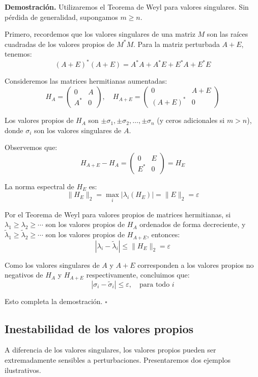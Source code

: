 \documentclass[12pt]{article}
\begin{document}
\textbf{Demostración.} Utilizaremos el Teorema de Weyl para valores singulares. Sin pérdida de generalidad, supongamos $m \geq n$.

Primero, recordemos que los valores singulares de una matriz $M$ son las raíces cuadradas de los valores propios de $M^*M$. Para la matriz perturbada $A + E$, tenemos:
\[
(A + E)^*(A + E) = A^*A + A^*E + E^*A + E^*E
\]

Consideremos las matrices hermitianas aumentadas:
\[
H_A = \begin{pmatrix}
0 & A \\
A^* & 0
\end{pmatrix}, \quad
H_{A+E} = \begin{pmatrix}
0 & A + E \\
(A + E)^* & 0
\end{pmatrix}
\]

Los valores propios de $H_A$ son $\pm\sigma_1, \pm\sigma_2, \ldots, \pm\sigma_n$ (y ceros adicionales si $m > n$), donde $\sigma_i$ son los valores singulares de $A$.

Observemos que:
\[
H_{A+E} - H_A = \begin{pmatrix}
0 & E \\
E^* & 0
\end{pmatrix} = H_E
\]

La norma espectral de $H_E$ es:
\[
\|H_E\|_2 = \max_{i} |\lambda_i(H_E)| = \|E\|_2 = \varepsilon
\]

Por el Teorema de Weyl para valores propios de matrices hermitianas, si $\lambda_1 \geq \lambda_2 \geq \cdots$ son los valores propios de $H_A$ ordenados de forma decreciente, y $\tilde{\lambda}_1 \geq \tilde{\lambda}_2 \geq \cdots$ son los valores propios de $H_{A+E}$, entonces:
\[
|\lambda_i - \tilde{\lambda}_i| \leq \|H_E\|_2 = \varepsilon
\]

Como los valores singulares de $A$ y $A + E$ corresponden a los valores propios no negativos de $H_A$ y $H_{A+E}$ respectivamente, concluimos que:
\[
|\sigma_i - \tilde{\sigma}_i| \leq \varepsilon, \quad \text{para todo } i
\]

Esto completa la demostración. $\square$

\subsection{Inestabilidad de los valores propios}

A diferencia de los valores singulares, los valores propios pueden ser extremadamente sensibles a perturbaciones. Presentaremos dos ejemplos ilustrativos.
\end{document}
